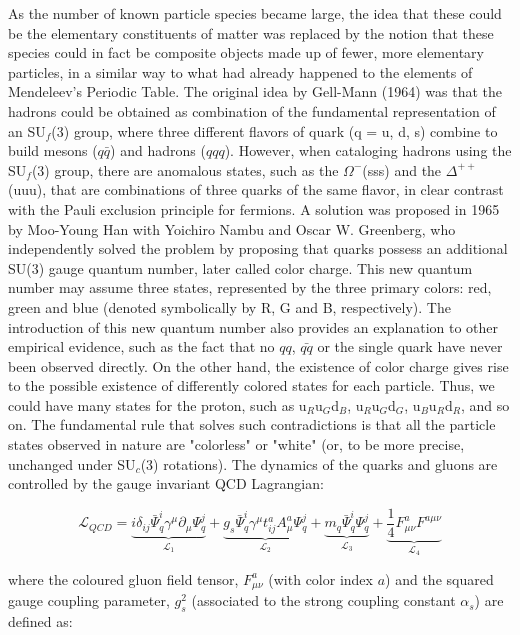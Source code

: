 As the number of known particle species became large, the idea that these could be the elementary constituents of matter was replaced by the notion that these species could in fact be composite objects made up of fewer, more elementary particles, in a similar way to what had already happened to the elements of Mendeleev's Periodic Table. The original idea by Gell-Mann (1964) was that the hadrons could be obtained as combination of the fundamental representation of an SU$_{f}$(3) group, where three different flavors of quark (q = u, d, s) combine to build mesons ($q\bar{q}$) and hadrons ($qqq$).
However, when cataloging hadrons using the SU$_{f}$(3) group, there are anomalous states, such as the $\Omega^{-}$(sss) and the  $\Delta^{++}$(uuu), that are combinations of three quarks of the same flavor, in clear contrast with the Pauli exclusion principle for fermions. A solution was proposed in 1965 by Moo-Young Han with Yoichiro Nambu and Oscar W. Greenberg, who independently solved the problem by proposing that quarks possess an additional SU(3) gauge quantum number, later called color charge.
This new quantum number may assume three states, represented by the three primary colors: red, green and blue (denoted symbolically by R, G and B, respectively). The introduction of this new quantum number also provides an explanation to other empirical evidence, such as the fact that no $qq$, $\bar{qq}$ or the single quark have never been observed directly. On the other hand, the existence of color charge gives rise to the possible existence of differently colored states for each particle. Thus, we could have many states for the proton, such as u$_{R}$u$_{G}$d$_{B}$, u$_{R}$u$_{G}$d$_{G}$, u$_{B}$u$_{R}$d$_{R}$, and so on. The fundamental rule that solves such contradictions is that all the particle states observed in nature are "colorless" or "white" (or, to be more precise, unchanged under SU$_{c}$(3) rotations).
The dynamics of the quarks and gluons are controlled by the gauge invariant QCD Lagrangian:


\begin{equation}\label{label:L}
\mathcal{L}_{QCD} = \underbrace{i\delta_{ij}\bar{\Psi}^{i}_{q}\gamma^{\mu}\partial_{\mu}\Psi^{j}_{q}}_{\mathcal{L}_{1}}+ \underbrace{g_{s}\bar{\Psi}^{i}_{q}\gamma^{\mu}t_{ij}^{a}A_{\mu}^{a}\Psi^{j}_{q}}_{\mathcal{L}_{2}}+ \underbrace{m_{q}\bar{\Psi}^{i}_{q}\Psi^{j}_{q}}_{\mathcal{L}_{3}}+ \underbrace{\frac{1}{4}F_{\mu\nu}^{a}F^{a \mu\nu}}_{\mathcal{L}_{4}}
\end{equation}

where the coloured gluon field tensor, $F_{\mu\nu}^{a}$ (with color index $a$) and the squared gauge coupling parameter, $g_{s}^{2}$ (associated to the strong coupling constant $\alpha_{s}$) are
defined as:

